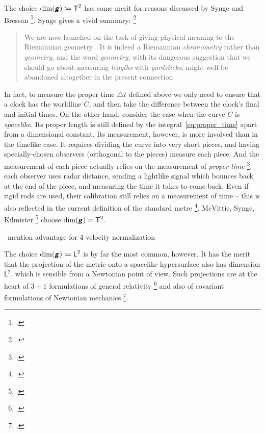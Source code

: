 \documentclass[\ifafour a4paper,12pt,\else a5paper,10pt,\fi%
onecolumn,oneside,article,%
british%
]{memoir}
\theoremstyle{remark}
\theoremstyle{innote}
\newcommand*{\mathte}[1]{\textbf{\textit{\textsf{#1}}}}
\newcommand*{\citep}{\footcites}
\newcommand*{\incr}{\triangle}%
\newcommand*{\defd}{\coloneqq}
\renewcommand*{\|}[1][]{\nonscript\,#1\vert\nonscript\;\mathopen{}}
\newcommand*{\sect}{\S}%
\newcommand*{\sects}{\S\S}%
\newcommand*{\chap}{ch.}%
\newcommand*{\puzzle}{{\fontencoding{U}\fontfamily{fontawesometwo}\selectfont\symbol{225}}}
\newcommand{\mynote}[1]{ {\color{notecolour}\puzzle\ #1}}
\newcommand*{\Le}{\textsf{L}}
\newcommand*{\Ti}{\textsf{T}}
\newcommand*{\yg}{\mathte{g}}
\newcommand*{\inct}{\incr t}
\begin{document}
The choice $\dim(\yg) \defd \Ti^{2}$ has some merit for reasons discussed
by Synge and Bressan \citep[\sects~III.2--4]{synge1960b}[\sects~15,
18]{bressan1978}. Synge gives a vivid summary: \citep[\sect~III.3
pp.~108--109]{synge1960b}
\begin{quote}\footnotesize
  We are now launched on the task of giving physical meaning to the
  Riemannian geometry \textelp{}. It is indeed a Riemannian
  \emph{chronometry} rather than \emph{geometry}, and the word
  \emph{geometry}, with its dangerous suggestion that we should go about
  measuring \emph{lengths} with \emph{yardsticks}, might well be abandoned
  altogether in the present connection
\end{quote}
In fact, to measure the proper time $\inct$ defined above we only need to
ensure that a clock has the worldline $C$, and then take the difference
between the clock's final and initial times. On the other hand, consider
the case when the curve $C$ is \emph{spacelike}. Its proper length is still
defined by the integral~\eqref{eq:proper_time} apart from a dimensional
constant. Its measurement, however, is more involved than in the timelike
case. It requires dividing the curve into very short pieces, and having
specially-chosen observers (orthogonal to the pieces) measure each piece.
And the measurement of each piece actually relies on the measurement of
\emph{proper time}
\citep[\chap~2]{frankel1979}[\sect~84]{landauetal1939_t1996}: each observer
uses radar distance, sending a lightlike signal which bounces back at the
end of the piece, and measuring the time it takes to come back. Even if
rigid rods are used, their calibration still relies on a measurement of
time -- this is also reflected in the current definition of the standard
metre \citep[p.~98]{bipm1983}[p.~25]{giacomo1984}. McVittie, Synge,
Kilmister
\citep[\sect~4.1]{mcvittie1956_r1965}[\sect~IV.5]{synge1960b}[\chap~II
p.~25]{kilmister1973} choose $\dim(\yg)=\Ti^{2}$.

\mynote{mention advantage for 4-velocity normalization}

The choice $\dim(\yg) \defd \Le^{2}$ is by far the most common, however. It
has the merit that the projection of the metric onto a spacelike
hypersurface also has dimension $\Le^{2}$, which is sensible from a
Newtonian point of view. Such projections are at the heart of $3+1$
formulations of general relativity \citep(I thank I.~Bengtsson for this
remark){gourgoulhon2007_r2012,alcubierre2008}[\chap~21]{misneretal1970_r1973}{wilsonetal2003_r2007,smarretal1978,york1979,smarretal1980}
and also of covariant formulations of Newtonian mechanics
\citep[\sects~B.II.152--154, D.II.203--205, D.V.238,
F.IV.285--289]{truesdelletal1960}[\sect~2.4]{marsdenetal1983b_r1994}.
\end{document}
